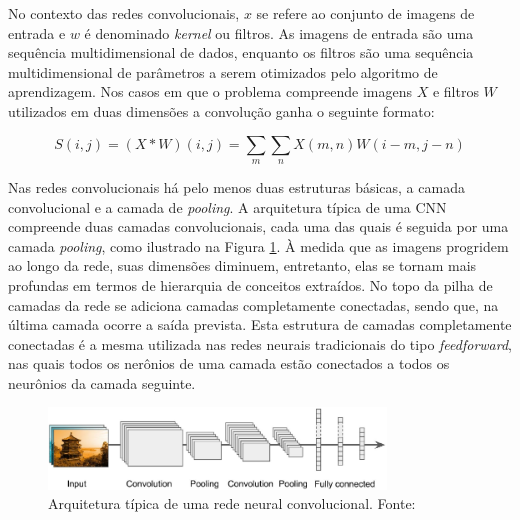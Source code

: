 No contexto das redes convolucionais, $x$ se refere ao conjunto de imagens de entrada 
e $w$ é denominado \textit{kernel} ou filtros. As imagens de entrada são uma sequência multidimensional 
de dados, enquanto os filtros são uma sequência multidimensional de parâmetros a serem 
otimizados pelo algoritmo de aprendizagem.
Nos casos em que o problema compreende imagens $X$ e filtros $W$ utilizados em duas dimensões 
a convolução ganha o seguinte formato:

\begin{equation}
 S(i,j) = (X*W)(i,j) = \sum_{m}\sum_{n}{X(m,n)W(i-m,j-n)}
\end{equation}

Nas redes convolucionais há pelo menos duas estruturas básicas, a camada convolucional e a camada de \textit{pooling}.
A arquitetura típica de uma CNN compreende duas camadas convolucionais, cada uma das quais é seguida por
uma camada \textit{pooling}, como ilustrado na Figura \ref{fig:cnn_basic_arq}. À medida que as imagens progridem
ao longo da rede, suas dimensões diminuem, entretanto, elas se tornam mais profundas
em termos de hierarquia de conceitos extraídos. No topo da pilha de camadas da rede
se adiciona camadas completamente conectadas, sendo que, na última camada ocorre a saída prevista.
Esta estrutura de camadas completamente conectadas é a mesma utilizada nas redes neurais tradicionais
do tipo \textit{feedforward}, nas quais todos os nerônios de uma camada estão conectados a todos os
neurônios da camada seguinte. 
\begin{figure}[htp]
\begin{center}
  \includegraphics[width=0.8\textwidth]{fig/cnn_basic_arq}
  \caption{Arquitetura típica de uma rede neural convolucional. Fonte:\cite{aurelien17}}
  \label{fig:cnn_basic_arq}
\end{center}
\end{figure}

